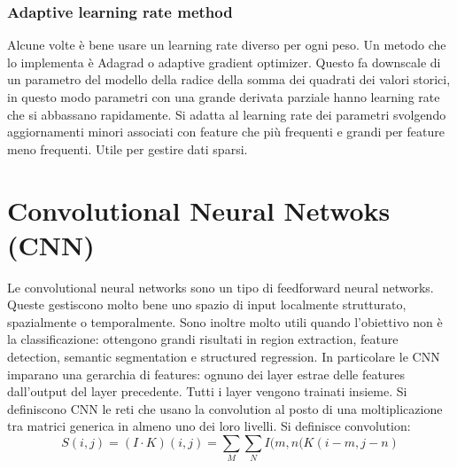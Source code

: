 		\subsubsection{Adaptive learning rate method}
		Alcune volte \`e bene usare un learning rate diverso per ogni peso.
		Un metodo che lo implementa \`e Adagrad o adaptive gradient optimizer.
		Questo fa downscale di un parametro del modello della radice della somma dei quadrati dei valori storici, in questo modo parametri con una grande derivata parziale hanno learning rate che si abbassano rapidamente.
		Si adatta al learning rate dei parametri svolgendo aggiornamenti minori associati con feature che pi\`u frequenti e grandi per feature meno frequenti.
		Utile per gestire dati sparsi.\\
		

\section{Convolutional Neural Netwoks (CNN)}
Le convolutional neural networks sono un tipo di feedforward neural networks.
Queste gestiscono molto bene uno spazio di input localmente strutturato, spazialmente o temporalmente.
Sono inoltre molto utili quando l'obiettivo non \`e la classificazione: ottengono grandi risultati in region extraction, feature detection, semantic segmentation e structured regression.
In particolare le CNN imparano una gerarchia di features: ognuno dei layer estrae delle features dall'output del layer precedente.
Tutti i layer vengono trainati insieme.
Si definiscono CNN le reti che usano la convolution al posto di una moltiplicazione tra matrici generica in almeno uno dei loro livelli.
Si definisce convolution:
$$S(i, j) = (I\cdot K)(i,j) = \sum\limits_M\sum\limits_NI(m,n(K(i-m,j-n)$$

